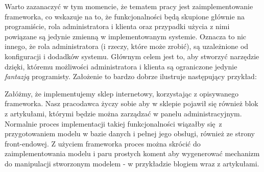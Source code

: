 Warto zazanaczyć w tym momencie, że tematem pracy jest zaimplementowanie frameworka, co wskazuje na to, że funkcjonalności będą skupione głównie na programiście, rola administratora i klienta oraz przypadki użycia z nimi powiązane są jedynie zmienną w implementowanym systemie. Oznacza to nic innego, że rola administratora (i rzeczy, które może zrobić), są uzależnione od konfiguracji i dodadków systemu. Głównym celem jest to, aby stworzyć narzędzie dzięki, któremu możliwości administratora i klienta są ograniczone jedynie \textit{fantazją} programisty. Założenie to bardzo dobrze ilustruje następujący przykład:
\begin{example}
	Załóżmy, że implementujemy sklep internetowy, korzystając z opisywanego frameworka. Nasz pracodawca życzy sobie aby w sklepie pojawił się również blok z artykułami, którymi będzie można zarządzać w panelu administracyjnym. Normalnie proces implementacji takiej funkcjonalności wiązałby się z przygotowaniem modelu w bazie danych i pełnej jego obsługi, również ze strony front-endowej. Z użyciem frameworka proces można skrócić do zaimplementowania modelu i paru prostych koment aby wygenerować mechanizm do manipulacji stworzonym modelem - w przykładzie blogiem wraz z artykułami. 
\end{example}

